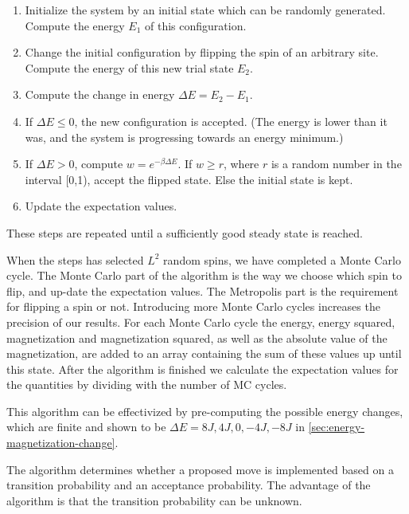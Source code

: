 \documentclass[../main.tex]{subfiles}
\begin{document}
\begin{enumerate}
    \item Initialize the system by an initial state which can be randomly generated. Compute the energy $E_1$ of this configuration. 
    \item Change the initial configuration by flipping the spin of an arbitrary site. Compute the energy of this new trial state $E_2$. 
    \item Compute the change in energy \ensuremath{\Delta E= E_2-E_1}.
    \item If \ensuremath{\Delta E\leq0}, the new configuration is accepted. (The energy is lower than it was, and the system is progressing towards an energy minimum.)
    \item If \ensuremath{\Delta E>0}, compute \ensuremath{w=e^{-\beta\Delta E}}. If \ensuremath{w\geq r}, where $r$ is a random number in the interval [0,1), accept the flipped state. Else the initial state is kept.
    \item Update the expectation values. 
\end{enumerate} These steps are repeated until a sufficiently good steady state is reached. 

When the steps has selected $L^2$ random spins, we have completed a Monte Carlo cycle. The Monte Carlo part of the algorithm is the way we choose which spin to flip,  and up-date the expectation values. The Metropolis part is the requirement for flipping a spin or not. Introducing more Monte Carlo cycles increases the precision of our results. For each Monte Carlo cycle the energy, energy squared, magnetization and magnetization squared, as well as the absolute value of the magnetization, are added to an array containing the sum of these values up until this state. After the algorithm is finished we calculate the expectation values for the quantities by dividing with the number of MC cycles.

This algorithm can be effectivized by pre-computing the possible energy changes, which are finite and shown to be \ensuremath{\Delta E= 8J, 4J, 0, -4J, -8J} in \cref{sec:energy-magnetization-change}. 

The algorithm determines whether a proposed move is implemented based on a transition probability and an acceptance probability. The advantage of the algorithm is that the transition probability can be unknown.
\end{document}
